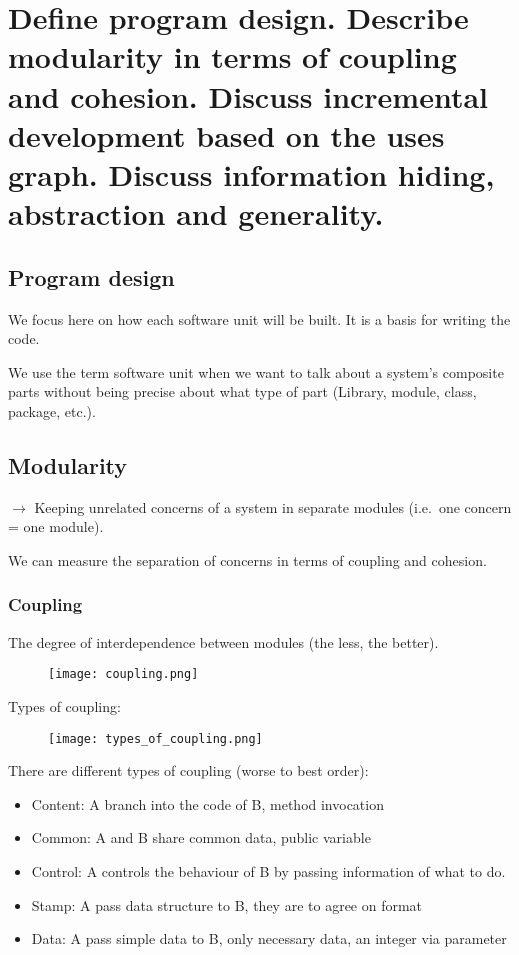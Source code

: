 \clearpage{}
\section{Define program design. Describe modularity in terms of coupling
and cohesion. Discuss incremental development based on the uses graph.
Discuss information hiding, abstraction and generality.}

\subsection{Program design}

We focus here on how each software unit will be built. It is a basis for writing the code. \newline

We use the term software unit when we want to talk about a system’s composite parts
without being precise about what type of part (Library, module, class, package, etc.).

\subsection{Modularity}

$\rightarrow$ Keeping unrelated concerns of a system in separate modules (i.e.\ one concern = one
module). \newline

We can measure the separation of concerns in terms of coupling and cohesion. \newline

\subsubsection{Coupling}

The degree of interdependence between modules (the less, the better).

\begin{figure}[!ht]
    \centering
    \texttt{[image: coupling.png]}
\end{figure}
\FloatBarrier{}

Types of coupling:
\begin{figure}[!ht]
    \centering
    \texttt{[image: types\_of\_coupling.png]}
\end{figure}
\FloatBarrier{}

There are different types of coupling (worse to best order):
\begin{itemize}
    \item Content: A branch into the code of B, method invocation
    \item Common: A and B share common data, public variable
    \item Control: A controls the behaviour of B by passing information of what
    to do.
    \item Stamp: A pass data structure to B, they are to agree on format
    \item Data: A pass simple data to B, only necessary data, an integer via parameter
\end{itemize}

